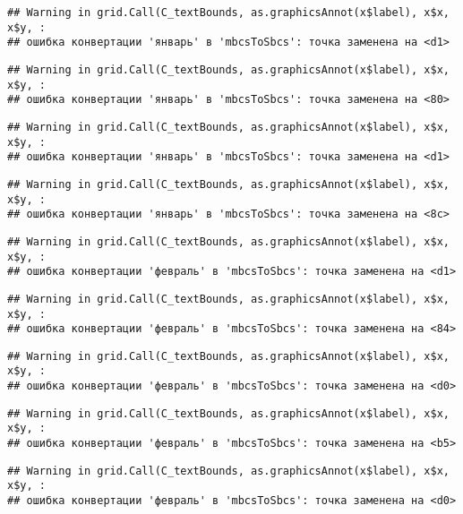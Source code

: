 \documentclass[
]{article}
\begin{document}
\begin{verbatim}
## Warning in grid.Call(C_textBounds, as.graphicsAnnot(x$label), x$x, x$y, :
## ошибка конвертации 'январь' в 'mbcsToSbcs': точка заменена на <d1>
\end{verbatim}

\begin{verbatim}
## Warning in grid.Call(C_textBounds, as.graphicsAnnot(x$label), x$x, x$y, :
## ошибка конвертации 'январь' в 'mbcsToSbcs': точка заменена на <80>
\end{verbatim}

\begin{verbatim}
## Warning in grid.Call(C_textBounds, as.graphicsAnnot(x$label), x$x, x$y, :
## ошибка конвертации 'январь' в 'mbcsToSbcs': точка заменена на <d1>
\end{verbatim}

\begin{verbatim}
## Warning in grid.Call(C_textBounds, as.graphicsAnnot(x$label), x$x, x$y, :
## ошибка конвертации 'январь' в 'mbcsToSbcs': точка заменена на <8c>
\end{verbatim}

\begin{verbatim}
## Warning in grid.Call(C_textBounds, as.graphicsAnnot(x$label), x$x, x$y, :
## ошибка конвертации 'февраль' в 'mbcsToSbcs': точка заменена на <d1>
\end{verbatim}

\begin{verbatim}
## Warning in grid.Call(C_textBounds, as.graphicsAnnot(x$label), x$x, x$y, :
## ошибка конвертации 'февраль' в 'mbcsToSbcs': точка заменена на <84>
\end{verbatim}

\begin{verbatim}
## Warning in grid.Call(C_textBounds, as.graphicsAnnot(x$label), x$x, x$y, :
## ошибка конвертации 'февраль' в 'mbcsToSbcs': точка заменена на <d0>
\end{verbatim}

\begin{verbatim}
## Warning in grid.Call(C_textBounds, as.graphicsAnnot(x$label), x$x, x$y, :
## ошибка конвертации 'февраль' в 'mbcsToSbcs': точка заменена на <b5>
\end{verbatim}

\begin{verbatim}
## Warning in grid.Call(C_textBounds, as.graphicsAnnot(x$label), x$x, x$y, :
## ошибка конвертации 'февраль' в 'mbcsToSbcs': точка заменена на <d0>
\end{verbatim}
\end{document}
